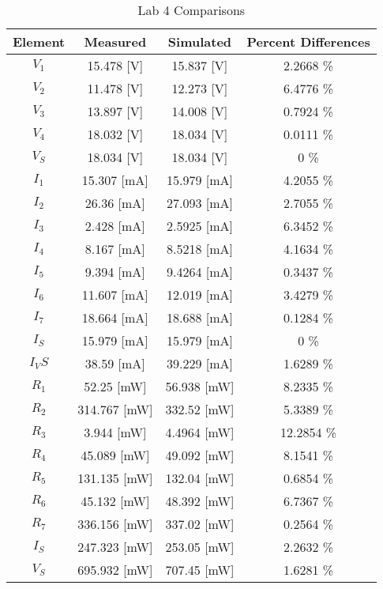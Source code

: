 \documentclass{article}
\begin{document}
\begin{table}[h]
\begin{center}
\label{code:resis}
\caption{Lab 4 Comparisons}
\begin{tabular}{c|c|c|c}
Element	&Measured&Simulated& Percent Differences 
\\\hline
$V_1$	&	15.478	[V] &	15.837	[V] &	2.2668	\% \\
$V_2$	&	11.478	[V] &	12.273	[V] &	6.4776	\% \\
$V_3$	&	13.897	[V] &	14.008	[V] &	0.7924	\% \\
$V_4$	&	18.032	[V] &	18.034	[V] &	0.0111	\% \\
$V_S$	&	18.034	[V] &	18.034	[V] &	0	\% \\
$I_1$	&	15.307	[mA] &	15.979	[mA] &	4.2055	\% \\
$I_2$	&	26.36	[mA] &	27.093	[mA] &	2.7055	\% \\
$I_3$	&	2.428	[mA] &	2.5925	[mA] &	6.3452	\% \\
$I_4$	&	8.167	[mA] &	8.5218	[mA] &	4.1634	\% \\
$I_5$	&	9.394	[mA] &	9.4264	[mA] &	0.3437	\% \\
$I_6$	&	11.607	[mA] &	12.019	[mA] &	3.4279	\% \\
$I_7$	&	18.664	[mA] &	18.688	[mA] &	0.1284	\% \\
$I_S$	&	15.979	[mA] &	15.979	[mA] &	0	\% \\
$I_VS$	&	38.59	[mA] &	39.229	[mA] &	1.6289	\% \\
$R_1$	&	52.25	[mW] &	56.938	[mW] &	8.2335	\% \\
$R_2$	&	314.767	[mW] &	332.52	[mW] &	5.3389	\% \\
$R_3$	&	3.944	[mW] &	4.4964	[mW] &	12.2854	\% \\
$R_4$	&	45.089	[mW] &	49.092	[mW] &	8.1541	\% \\
$R_5$	&	131.135	[mW] &	132.04	[mW] &	0.6854	\% \\
$R_6$	&	45.132	[mW] &	48.392	[mW] &	6.7367	\% \\
$R_7$	&	336.156	[mW] &	337.02	[mW] &	0.2564	\% \\
$I_S$	&	247.323	[mW] &	253.05	[mW] &	2.2632	\% \\
$V_S$	&	695.932	[mW] &	707.45	[mW] &	1.6281	\% \\


\end{tabular}
\end{center}

\end{table}
\end{document}
